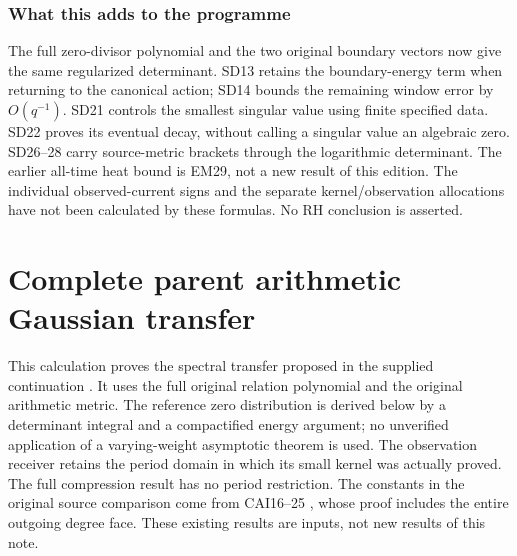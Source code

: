 \documentclass[11pt]{article}
\begin{document}
\section*{What this adds to the programme}
The full zero-divisor polynomial and the two original boundary vectors now
give the same regularized determinant. SD13 retains the boundary-energy
term when returning to the canonical action; SD14 bounds the remaining
window error by $O(q^{-1})$. SD21 controls the smallest singular value
using finite specified data. SD22 proves its eventual decay, without
calling a singular value an algebraic zero. SD26--28 carry source-metric
brackets through the logarithmic determinant. The earlier all-time heat
bound is EM29, not a new result of this edition.
The individual observed-current signs and the separate kernel/observation
allocations have not been calculated by these formulas. No RH conclusion
is asserted.
\endgroup

\clearpage\begingroup
\part*{Complete parent arithmetic Gaussian transfer}
\newcommand{\osdngR}{\mathbb R}\newcommand{\osdngC}{\mathbb C}
\newcommand{\osdngPP}{\mathcal P}\newcommand{\osdngdd}{\,d}
\newcommand{\osdngnorm}[1]{\left\lVert#1\right\rVert}
\newcommand{\osdngTr}{\operatorname{Tr}}\newcommand{\osdngrank}{\operatorname{rank}}
\newtheorem{osdngtheorem}{Theorem}\newtheorem{osdnglemma}[osdngtheorem]{Lemma}


This calculation proves the spectral transfer proposed in the supplied
continuation \cite{osdng:incoming}. It uses the full original relation polynomial
and the original arithmetic metric. The reference zero distribution is
derived below by a determinant integral and a compactified energy argument;
no unverified application of a varying-weight asymptotic theorem is used.
The observation receiver retains the period domain in which its small
kernel was actually proved. The full compression result has no period
restriction. The constants in the original source comparison come from
CAI16--25 \cite{osdng:cumulative}, whose proof includes the entire outgoing degree
face. These existing results are inputs, not new results of this note.
\end{document}
